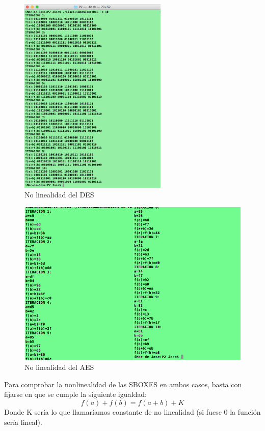\documentclass{apuntes}
\begin{document}
\begin{figure}
	\includegraphics[width=200pt]{line2.png}
	\caption{No linealidad del DES}
\end{figure}

\begin{figure}
	\includegraphics[width=400pt]{line1.png}
	\caption{No linealidad del AES}
\end{figure}

Para comprobar la nonlinealidad de las
SBOXES en ambos casos, basta con fijarse
en que se cumple la siguiente igualdad:
$$f(a)+f(b)=f(a+b)+K$$
Donde K sería lo que
llamaríamos constante
de no linealidad (si
fuese 0 la función sería
lineal).
\end{document}
